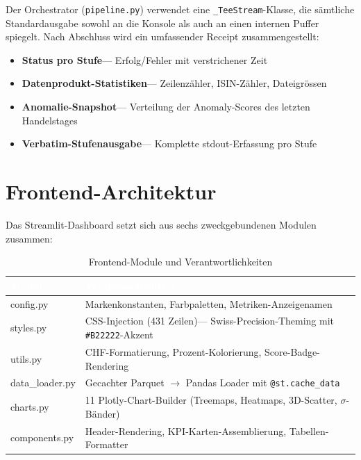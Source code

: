 \documentclass[12pt, a4paper, oneside]{report}
\newcommand{\code}[1]{\texttt{\small\textcolor{darknavy}{#1}}}
\begin{document}
Der Orchestrator (\code{pipeline.py}) verwendet eine \code{\_TeeStream}-Klasse, die s\"amtliche Standardausgabe sowohl an die Konsole als auch an einen internen Puffer spiegelt. Nach Abschluss wird ein umfassender Receipt zusammengestellt:

\begin{itemize}
  \item \textbf{Status pro Stufe}\;--- Erfolg/Fehler mit verstrichener Zeit
  \item \textbf{Datenprodukt-Statistiken}\;--- Zeilenz\"ahler, ISIN-Z\"ahler, Dateigr\"ossen
  \item \textbf{Anomalie-Snapshot}\;--- Verteilung der Anomaly-Scores des letzten Handelstages
  \item \textbf{Verbatim-Stufenausgabe}\;--- Komplette stdout-Erfassung pro Stufe
\end{itemize}

\section{Frontend-Architektur}

Das Streamlit-Dashboard setzt sich aus sechs zweckgebundenen Modulen zusammen:

\begin{table}[H]
\centering
\caption{Frontend-Module und Verantwortlichkeiten}
\label{tab:frontend-modules}
\begin{tabularx}{\textwidth}{>{\ttfamily}l X}
  \toprule
  \rowcolor{darknavy} \textcolor{white}{\textrm{Modul}} & \textcolor{white}{Verantwortlichkeit} \\
  \midrule
  config.py       & Markenkonstanten, Farbpaletten, Metriken-Anzeigenamen \\
  styles.py       & CSS-Injection (431 Zeilen)\;--- Swiss-Precision-Theming mit \code{\#B22222}-Akzent \\
  utils.py        & CHF-Formatierung, Prozent-Kolorierung, Score-Badge-Rendering \\
  data\_loader.py & Gecachter Parquet $\to$ Pandas Loader mit \code{@st.cache\_data} \\
  charts.py       & 11 Plotly-Chart-Builder (Treemaps, Heatmaps, 3D-Scatter, $\sigma$-B\"ander) \\
  components.py   & Header-Rendering, KPI-Karten-Assemblierung, Tabellen-Formatter \\
  \bottomrule
\end{tabularx}
\end{table}
\end{document}
